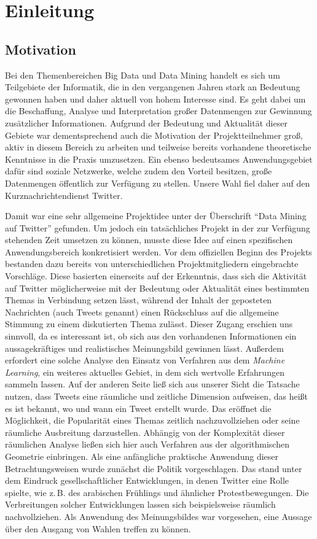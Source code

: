 \chapter{Einleitung}

\section{Motivation}

Bei den Themenbereichen Big Data und Data Mining handelt es sich um Teilgebiete der Informatik, die in den vergangenen Jahren stark an Bedeutung gewonnen haben und daher aktuell von hohem Interesse sind. Es geht dabei um die Beschaffung, Analyse und Interpretation großer Datenmengen zur Gewinnung zusätzlicher Informationen. Aufgrund der Bedeutung und Aktualität dieser Gebiete war dementsprechend auch die Motivation der Projektteilnehmer groß, aktiv in diesem Bereich zu arbeiten und teilweise bereits vorhandene theoretische Kenntnisse in die Praxis umzusetzen. Ein ebenso bedeutsames Anwendungsgebiet dafür sind soziale Netzwerke, welche zudem den Vorteil besitzen, große Datenmengen öffentlich zur Verfügung zu stellen. Unsere Wahl fiel daher auf den Kurznachrichtendienst Twitter.

Damit war eine sehr allgemeine Projektidee unter der Überschrift "`Data Mining auf Twitter"' gefunden. Um jedoch ein tatsächliches Projekt in der zur Verfügung stehenden Zeit umsetzen zu können, musste diese Idee auf einen spezifischen Anwendungsbereich konkretisiert werden. Vor dem offiziellen Beginn des Projekts bestanden dazu bereits von unterschiedlichen Projektmitgliedern eingebrachte Vorschläge. Diese basierten einerseits auf der Erkenntnis, dass sich die Aktivität auf Twitter möglicherweise mit der Bedeutung oder Aktualität eines bestimmten Themas in Verbindung setzen lässt, während der Inhalt der geposteten Nachrichten (auch Tweets genannt) einen Rückschluss auf die allgemeine Stimmung zu einem diskutierten Thema zulässt. Dieser Zugang erschien uns sinnvoll, da es interessant ist, ob sich aus den vorhandenen Informationen ein aussagekräftiges und realistisches Meinungsbild gewinnen lässt. Außerdem erfordert eine solche Analyse den Einsatz von Verfahren aus dem \textit{Machine Learning}, ein weiteres aktuelles Gebiet, in dem sich wertvolle Erfahrungen sammeln lassen. Auf der anderen Seite ließ sich aus unserer Sicht die Tatsache nutzen, dass Tweets eine räumliche und zeitliche Dimension aufweisen, das heißt es ist bekannt, wo und wann ein Tweet erstellt wurde. Das eröffnet die Möglichkeit, die Popularität eines Themas zeitlich nachzuvollziehen oder seine räumliche Ausbreitung darzustellen. Abhängig von der Komplexität dieser räumlichen Analyse ließen sich hier auch Verfahren aus der algorithmischen Geometrie einbringen. Als eine anfängliche praktische Anwendung dieser Betrachtungsweisen wurde zunächst die Politik vorgeschlagen. Das stand unter dem Eindruck gesellschaftlicher Entwicklungen, in denen Twitter eine Rolle spielte, wie z.\,B. des arabischen Frühlings und ähnlicher Protestbewegungen. Die Verbreitungen solcher Entwicklungen lassen sich beispielsweise räumlich nachvollziehen. Als Anwendung des Meinungsbildes war vorgesehen, eine Aussage über den Ausgang von Wahlen treffen zu können.

